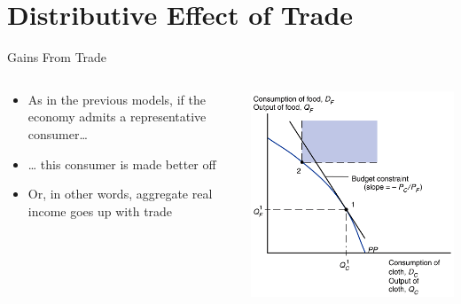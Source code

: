 \documentclass[10pt,hyperref={CJKbookmarks=true},xcolor=dvipsnames,aspectratio=169]{beamer}
\begin{document}
\section{Distributive Effect of Trade}
\begin{frame}{Gains From Trade }


\begin{columns}[onlytextwidth]
\begin{column}{0.5\textwidth}
\begin{itemize}
\item As in the previous models, if the economy admits a representative
consumer… 
\item … this consumer is made better off 
\item Or, in other words, aggregate real income goes up with trade
\end{itemize}

\end{column}
\begin{column}{0.5\textwidth}
\includegraphics[width=\columnwidth]{fig/sfm/lec4-22}
\end{column}
\end{columns}

\end{frame}
\end{document}
